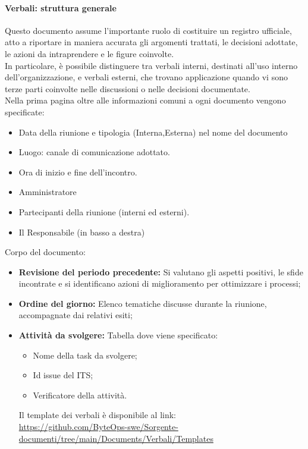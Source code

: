 \documentclass{article}
\begin{document}
\paragraph{Verbali: struttura generale}
Questo documento assume l'importante ruolo di costituire un registro ufficiale, atto a riportare in maniera accurata gli argomenti trattati, le decisioni adottate, le azioni da intraprendere e le figure coinvolte.\\
In particolare, è possibile distinguere tra verbali interni, destinati all'uso interno dell'organizzazione, e verbali esterni, che trovano applicazione quando vi sono terze parti coinvolte nelle discussioni o nelle decisioni documentate.\\ 
Nella prima pagina oltre alle informazioni comuni a ogni documento vengono specificate:
\begin{itemize}
    \item Data della riunione e tipologia (Interna,Esterna) nel nome del documento
    \item Luogo: canale di comunicazione adottato.
    \item Ora di inizio e fine dell'incontro.
    \item Amministratore
    \item Partecipanti della riunione (interni ed esterni).
    \item Il Responsabile (in basso a destra)
\end{itemize}
Corpo del documento:

\begin{itemize}
    \item  \textbf{Revisione del periodo precedente:} Si valutano gli aspetti positivi, le sfide incontrate e si identificano azioni di miglioramento per ottimizzare i processi;
    \item  \textbf{Ordine del giorno:} Elenco tematiche discusse durante la riunione, accompagnate dai relativi esiti;
    \item  \textbf{Attività da svolgere:} Tabella dove viene specificato:
    \begin{itemize}
        \item Nome della task da svolgere;
        \item Id issue del ITS;
        \item Verificatore della attività.
    \end{itemize}

    Il template dei verbali è disponibile al link:\\ \href{https://github.com/ByteOps-swe/Sorgente-documenti/tree/main/Documents/Verbali/Templates}{https://github.com/ByteOps-swe/Sorgente-documenti/tree/main/Documents/Verbali/Templates}

\end{itemize}
\end{document}
